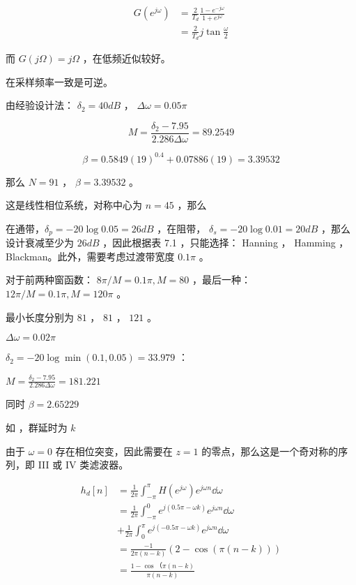 \documentclass[lang=cn,11pt,a4paper,cite=authoryear,twocolumn]{elegantpaper}
\begin{document}

\[
\begin{aligned}
    G(e^{j\omega}) &= \frac{2}{T_d} \frac{1-e^{-j\omega}}{1+e^{j\omega}} \\ 
    &= \frac{2}{T_d} j \tan  \frac{\omega}{2}
\end{aligned}    
\]


而 \(G(j\Omega) = j \Omega\) ，在低频近似较好。


在采样频率一致是可逆。


由经验设计法： \(\delta_2 = 40 dB\) ， \(\Delta \omega = 0.05 \pi \) 

\[M = \frac{\delta_2 - 7.95}{2.286 \Delta \omega} = 89.2549\]

\[\beta = 0.5849 (19)^{0.4} + 0.07886 (19) = 3.39532\]

那么 \(N = 91\) ， \(\beta = 3.39532\) 。

这是线性相位系统，对称中心为 \(n = 45\) ，那么


在通带，\(\delta_p = -20 \log 0.05 = 26 dB\) ，在阻带， \(\delta_s = -20 \log 0.01 = 20 dB\) ，那么设计衰减至少为 \(26 dB\) ，因此根据表 7.1 ，只能选择： Hanning ， Hamming ， Blackman。此外，需要考虑过渡带宽度 \(0.1\pi\) 。

对于前两种窗函数： \(8 \pi / M = 0.1 \pi, M = 80\) ，最后一种： \(12 \pi / M = 0.1 \pi, M = 120 \pi\) 。

最小长度分别为 \(81\) ， \(81\) ， \(121\) 。



\(\Delta \omega = 0.02 \pi\) 

\(\delta_2 = -20 \log \min (0.1, 0.05) = 33.979\) ：

\(M = \frac{\delta_2 - 7.95}{2.286 \Delta \omega} = 181.221\)

同时 \(\beta = 2.65229\)



如 ，群延时为 \(k\) 



由于 \(\omega = 0\) 存在相位突变，因此需要在 \(z = 1\) 的零点，那么这是一个奇对称的序列，即 III 或 IV 类滤波器。


\[\begin{aligned}
    h_d[n] &= \frac{1}{2\pi} \int_{-\pi}^\pi H(e^{j\omega}) e^{j\omega n } \dd{\omega} \\ 
    &=  \frac{1}{2\pi} \int_{-\pi}^0 e^{j(0.5\pi - \omega k)} e^{j\omega n } \dd{\omega} \\ 
    &+  \frac{1}{2\pi} \int_{0}^\pi e^{j(-0.5\pi - \omega k)} e^{j\omega n } \dd{\omega} \\
    &= \frac{-1}{2\pi(n-k)} (2 - \cos (\pi(n - k )))  \\ 
    &= \frac{1-\cos （\pi (n-k)}{\pi (n - k)}
\end{aligned}\]
\end{document}
